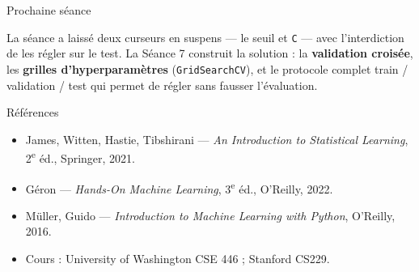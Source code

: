 \documentclass[aspectratio=169,11pt]{beamer}
\begin{document}
\begin{frame}{Prochaine séance}
\begin{ucadfront}
{\small La séance a laissé deux curseurs en suspens — le seuil et \texttt{C} — avec l'interdiction de les régler sur le test. La Séance 7 construit la solution : la \textbf{validation croisée}, les \textbf{grilles d'hyperparamètres} (\texttt{GridSearchCV}), et le protocole complet train / validation / test qui permet de régler sans fausser l'évaluation.}
\end{ucadfront}
\end{frame}

\begin{frame}{Références}
\begin{itemize}\small
  \item James, Witten, Hastie, Tibshirani — \emph{An Introduction to Statistical Learning}, 2\textsuperscript{e} éd., Springer, 2021.
  \item Géron — \emph{Hands-On Machine Learning}, 3\textsuperscript{e} éd., O'Reilly, 2022.
  \item Müller, Guido — \emph{Introduction to Machine Learning with Python}, O'Reilly, 2016.
  \item Cours : University of Washington CSE 446 ; Stanford CS229.
\end{itemize}
\end{frame}
\end{document}
